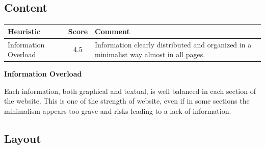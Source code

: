 \subsection{Content}
\begin{table}[H]
  \begin{center}
    \label{tab:table1}
    \begin{tabular}{||l|c|p{8cm}||} %
      \textbf{Heuristic} & \textbf{Score} & \textbf{Comment}\\
      
      \hline
     Information Overload & 4.5 & Information clearly distributed and organized in a minimalist way almost in all pages.\\
     
    \end{tabular}
  \end{center}
\end{table}
\medskip
\textbf{Information Overload}\par
Each information, both graphical and textual, is well balanced in each section of the website. This is one of the strength of website, even if in some sections the minimalism appears too grave and risks leading to a lack of information.

\pagebreak
\subsection{Layout}
\label{Layout}

